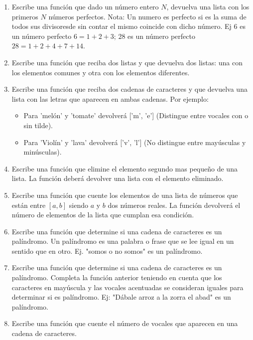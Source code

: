 \documentclass[12pt]{article}
\begin{document}
\begin{enumerate}
\item  Escribe una función que dado un número entero $N$, devuelva una lista con los primeros $N$ números perfectos.
Nota: Un numero es perfecto si es la suma de todos sus divisoresde sin 
contar el mismo coincide con dicho número.
Ej 6 es un número perfecto $6=1+2+3$; $28$ es un número perfecto $28=1+2+4+7+14$.
		










\newpage 

\item Escribe una función que reciba dos listas y que devuelva  dos listas: una con los elementos 
comunes y otra con los elementos diferentes.

	
\item Escribe una función  que reciba dos cadenas de caracteres y que devuelva una lista 
con las letras que aparecen en ambas cadenas.
Por ejemplo:
\begin{itemize}
		\item Para 'melón' y 'tomate' devolverá ['m', 'e'] (Distingue entre vocales con o sin tilde).
		\item Para 'Violín' y 'lava' devolverá ['v', 'l'] (No distingue entre mayúsculas y minúsculas).
\end{itemize}

		
\item Escribe una función que elimine el elemento segundo mas pequeño de una lista. 
La función deberá devolver una lista con el elemento eliminado. 
	


\item Escribe una función que cuente los elementos de una lista de números 
que están entre $ [a, b] $ siendo $a$ y $b$ dos números reales. 
La función devolverá el número de elementos de la lista que cumplan esa condición. 


\item Escribe una función que determine si una cadena de caracteres es un palíndromo.
Un palíndromo  es una palabra o frase que se lee igual en un sentido que en otro.
Ej.  "somos o no somos" es un palíndromo. 
\item Escribe una función que determine si una cadena de caracteres es un palíndromo.
Completa la función anterior teniendo en cuenta que los caracteres en mayúscula y las vocales acentuadas 
se consideran iguales para determinar si es palíndromo. 
Ej:  "Dábale arroz a la zorra el abad" es un palíndromo. 
\item Escribe una función que cuente el número de vocales que aparecen en una cadena de caracteres. 


\end{enumerate}
\end{document}
